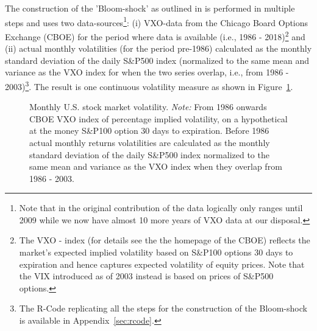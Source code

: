 \documentclass[a4paper,12pt,oneside,pointednumbers,bibtotoc,bigheadings,liststotoc]{scrbook}
\begin{document}
The construction of the 'Bloom-shock' as outlined in \citet{bloom:09} is performed in multiple steps and uses two data-sources\footnote{Note that in the original contribution of \citet{bloom:09} the data logically only ranges until 2009 while we now have almost 10 more years of VXO data at our disposal.}: (i) VXO-data from the Chicago Board Options Exchange (CBOE) for the period where data is available (i.e., 1986 - 2018)\footnote{The VXO - index (for details see the the homepage of the CBOE) reflects the market's expected implied volatility based on S\&P100 options 30 days to expiration and hence captures expected volatility of equity prices. Note that the VIX introduced as of 2003 instead is based on prices of S\&P500 options.} and (ii) actual monthly volatilities (for the period pre-1986) calculated as the monthly standard deviation of the daily S\&P500 index (normalized to the same mean and variance as the VXO index for when the two series overlap, i.e., from 1986 - 2003)\footnote{The R-Code replicating all the steps for the construction of the Bloom-shock is available in Appendix~\ref{sec:rcode}.}. The result is one continuous volatility measure as shown in Figure~\ref{fig:volatility}.
\begin{figure}[!ht]
   \centering
   \setlength\fboxsep{0pt}
   \setlength\fboxrule{0pt}
      \caption[Monthly U.S. stock market volatility.]{Monthly U.S. stock market volatility.
      \textit{Note:} From 1986 onwards CBOE VXO index of percentage implied volatility, on a hypothetical at the money S\&P100 option 30 days to expiration. Before 1986 actual monthly returns volatilities are calculated as the monthly standard deviation of the daily S\&P500 index normalized to the same mean and variance as the VXO index when they overlap from 1986 - 2003.}
   \label{fig:volatility}
\end{figure}
\end{document}
